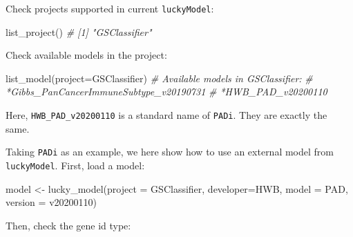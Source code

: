 \documentclass[
  12pt,
]{book}
\newenvironment{Shaded}{\begin{snugshade}}{\end{snugshade}}
\newcommand{\AttributeTok}[1]{\textcolor[rgb]{0.77,0.63,0.00}{#1}}
\newcommand{\CommentTok}[1]{\textcolor[rgb]{0.56,0.35,0.01}{\textit{#1}}}
\newcommand{\FunctionTok}[1]{\textcolor[rgb]{0.00,0.00,0.00}{#1}}
\newcommand{\NormalTok}[1]{#1}
\newcommand{\OtherTok}[1]{\textcolor[rgb]{0.56,0.35,0.01}{#1}}
\newcommand{\SpecialCharTok}[1]{\textcolor[rgb]{0.00,0.00,0.00}{#1}}
\newcommand{\StringTok}[1]{\textcolor[rgb]{0.31,0.60,0.02}{#1}}
\begin{document}
Check projects supported in current \texttt{luckyModel}:

\begin{Shaded}
\begin{Highlighting}[]
\FunctionTok{list\_project}\NormalTok{()}
\CommentTok{\# [1] "GSClassifier"}
\end{Highlighting}
\end{Shaded}

Check available models in the project:

\begin{Shaded}
\begin{Highlighting}[]
\FunctionTok{list\_model}\NormalTok{(}\AttributeTok{project=}\StringTok{\textquotesingle{}GSClassifier\textquotesingle{}}\NormalTok{)}
\CommentTok{\# Available models in GSClassifier:}
\CommentTok{\#   *Gibbs\_PanCancerImmuneSubtype\_v20190731}
\CommentTok{\#   *HWB\_PAD\_v20200110}
\end{Highlighting}
\end{Shaded}

Here, \texttt{HWB\_PAD\_v20200110} is a standard name of \texttt{PADi}. They are exactly the same.

Taking \texttt{PADi} as an example, we here show how to use an external model from \texttt{luckyModel}. First, load a model:

\begin{Shaded}
\begin{Highlighting}[]
\NormalTok{model }\OtherTok{\textless{}{-}} \FunctionTok{lucky\_model}\NormalTok{(}\AttributeTok{project =} \StringTok{\textquotesingle{}GSClassifier\textquotesingle{}}\NormalTok{,}
                     \AttributeTok{developer=}\StringTok{\textquotesingle{}HWB\textquotesingle{}}\NormalTok{,}
                     \AttributeTok{model =} \StringTok{\textquotesingle{}PAD\textquotesingle{}}\NormalTok{,}
                     \AttributeTok{version =} \StringTok{\textquotesingle{}v20200110\textquotesingle{}}\NormalTok{)}
\end{Highlighting}
\end{Shaded}

Then, check the gene id type:

\begin{Shaded}
\end{Shaded}
\end{document}

